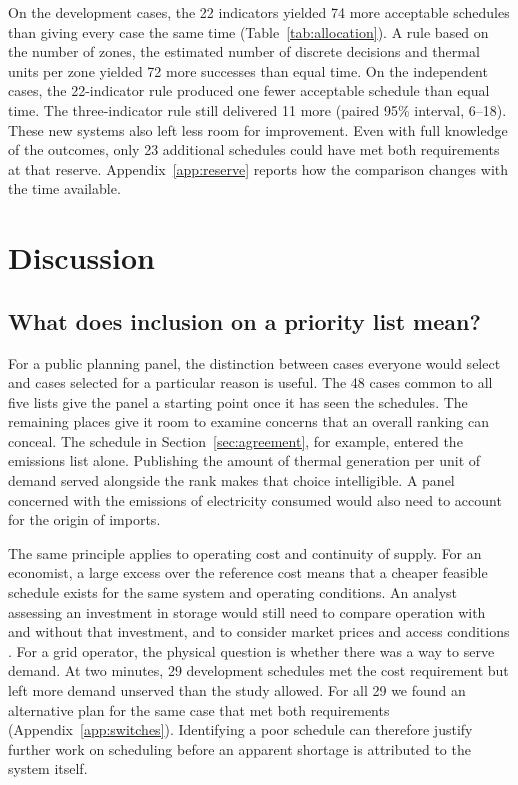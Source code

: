 \documentclass[11pt,a4paper]{article}
\begin{document}
On the development cases, the 22 indicators yielded 74 more acceptable schedules than giving every case the same time (Table~\ref{tab:allocation}). A rule based on the number of zones, the estimated number of discrete decisions and thermal units per zone yielded 72 more successes than equal time. On the independent cases, the 22-indicator rule produced one fewer acceptable schedule than equal time. The three-indicator rule still delivered 11 more (paired 95\% interval, 6--18). These new systems also left less room for improvement. Even with full knowledge of the outcomes, only 23 additional schedules could have met both requirements at that reserve. Appendix~\ref{app:reserve} reports how the comparison changes with the time available.

\section{Discussion}

\subsection{What does inclusion on a priority list mean?}

For a public planning panel, the distinction between cases everyone would select and cases selected for a particular reason is useful. The 48 cases common to all five lists give the panel a starting point once it has seen the schedules. The remaining places give it room to examine concerns that an overall ranking can conceal. The schedule in Section~\ref{sec:agreement}, for example, entered the emissions list alone. Publishing the amount of thermal generation per unit of demand served alongside the rank makes that choice intelligible. A panel concerned with the emissions of electricity consumed would also need to account for the origin of imports.

The same principle applies to operating cost and continuity of supply. For an economist, a large excess over the reference cost means that a cheaper feasible schedule exists for the same system and operating conditions. An analyst assessing an investment in storage would still need to compare operation with and without that investment, and to consider market prices and access conditions \citep{newbery2024}. For a grid operator, the physical question is whether there was a way to serve demand. At two minutes, 29 development schedules met the cost requirement but left more demand unserved than the study allowed. For all 29 we found an alternative plan for the same case that met both requirements (Appendix~\ref{app:switches}). Identifying a poor schedule can therefore justify further work on scheduling before an apparent shortage is attributed to the system itself.
\end{document}
